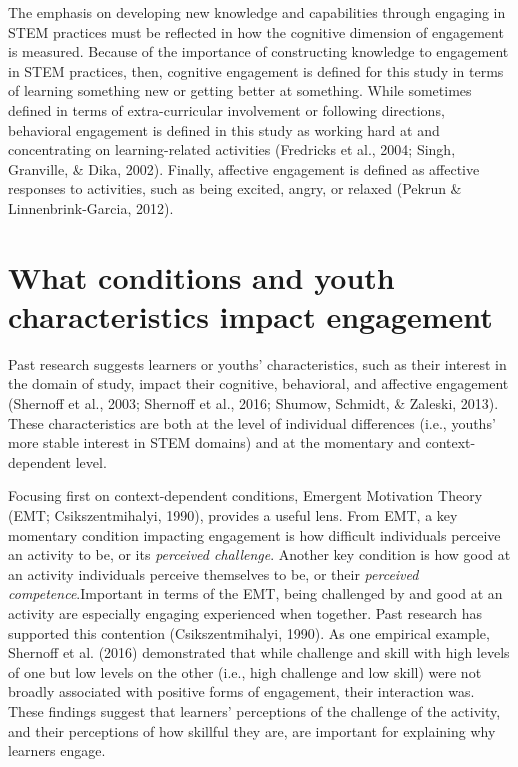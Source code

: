 \documentclass[]{msu-thesis}
\theoremstyle{definition}
\theoremstyle{definition}
\theoremstyle{definition}
\theoremstyle{remark}
\begin{document}
The emphasis on developing new knowledge and capabilities through
engaging in STEM practices must be reflected in how the cognitive
dimension of engagement is measured. Because of the importance of
constructing knowledge to engagement in STEM practices, then, cognitive
engagement is defined for this study in terms of learning something new
or getting better at something. While sometimes defined in terms of
extra-curricular involvement or following directions, behavioral
engagement is defined in this study as working hard at and concentrating
on learning-related activities (Fredricks et al., 2004; Singh,
Granville, \& Dika, 2002). Finally, affective engagement is defined as
affective responses to activities, such as being excited, angry, or
relaxed (Pekrun \& Linnenbrink-Garcia, 2012).

\section{What conditions and youth characteristics impact
engagement}\label{what-conditions-and-youth-characteristics-impact-engagement}

Past research suggests learners or youths' characteristics, such as
their interest in the domain of study, impact their cognitive,
behavioral, and affective engagement (Shernoff et al., 2003; Shernoff et
al., 2016; Shumow, Schmidt, \& Zaleski, 2013). These characteristics are
both at the level of individual differences (i.e., youths' more stable
interest in STEM domains) and at the momentary and context-dependent
level.

Focusing first on context-dependent conditions, Emergent Motivation
Theory (EMT; Csikszentmihalyi, 1990), provides a useful lens. From EMT,
a key momentary condition impacting engagement is how difficult
individuals perceive an activity to be, or its \emph{perceived
challenge}. Another key condition is how good at an activity individuals
perceive themselves to be, or their \emph{perceived
competence}.Important in terms of the EMT, being challenged by and good
at an activity are especially engaging experienced when together. Past
research has supported this contention (Csikszentmihalyi, 1990). As one
empirical example, Shernoff et al. (2016) demonstrated that while
challenge and skill with high levels of one but low levels on the other
(i.e., high challenge and low skill) were not broadly associated with
positive forms of engagement, their interaction was. These findings
suggest that learners' perceptions of the challenge of the activity, and
their perceptions of how skillful they are, are important for explaining
why learners engage.
\end{document}
